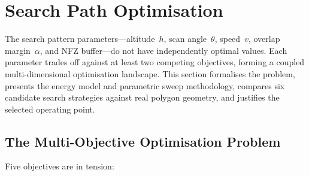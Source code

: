 %

\section{Search Path Optimisation}\label{sec:path-opt}

The search pattern parameters---altitude~$h$, scan angle~$\theta$, speed~$v$, overlap margin~$\alpha$, and NFZ buffer---do not have independently optimal values.
Each parameter trades off against at least two competing objectives, forming a coupled multi-dimensional optimisation landscape.
This section formalises the problem, presents the energy model and parametric sweep methodology, compares six candidate search strategies against real polygon geometry, and justifies the selected operating point.

\subsection{The Multi-Objective Optimisation Problem}\label{sec:moo}

Five objectives are in tension:


